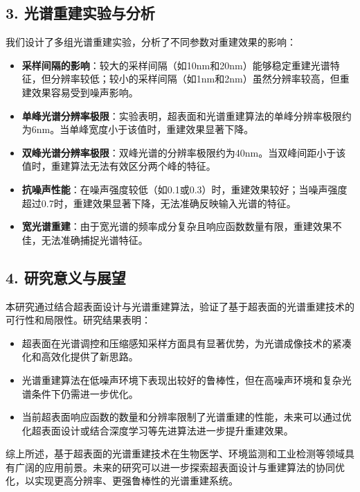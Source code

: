 \documentclass[12pt,hyperref,a4paper,UTF8]{ctexart}
\begin{document}
\subsection*{3. 光谱重建实验与分析}
我们设计了多组光谱重建实验，分析了不同参数对重建效果的影响：
\begin{itemize}
    \item \textbf{采样间隔的影响}：较大的采样间隔（如10nm和20nm）能够稳定重建光谱特征，但分辨率较低；较小的采样间隔（如1nm和2nm）虽然分辨率较高，但重建效果容易受到噪声影响。
    \item \textbf{单峰光谱分辨率极限}：实验表明，超表面和光谱重建算法的单峰分辨率极限约为6nm。当单峰宽度小于该值时，重建效果显著下降。
    \item \textbf{双峰光谱分辨率极限}：双峰光谱的分辨率极限约为40nm。当双峰间距小于该值时，重建算法无法有效区分两个峰的特征。
    \item \textbf{抗噪声性能}：在噪声强度较低（如0.1或0.3）时，重建效果较好；当噪声强度超过0.7时，重建效果显著下降，无法准确反映输入光谱的特征。
    \item \textbf{宽光谱重建}：由于宽光谱的频率成分复杂且响应函数数量有限，重建效果不佳，无法准确捕捉光谱特征。
\end{itemize}

\subsection*{4. 研究意义与展望}
本研究通过结合超表面设计与光谱重建算法，验证了基于超表面的光谱重建技术的可行性和局限性。研究结果表明：
\begin{itemize}
    \item 超表面在光谱调控和压缩感知采样方面具有显著优势，为光谱成像技术的紧凑化和高效化提供了新思路。
    \item 光谱重建算法在低噪声环境下表现出较好的鲁棒性，但在高噪声环境和复杂光谱条件下仍需进一步优化。
    \item 当前超表面响应函数的数量和分辨率限制了光谱重建的性能，未来可以通过优化超表面设计或结合深度学习等先进算法进一步提升重建效果。
\end{itemize}

综上所述，基于超表面的光谱重建技术在生物医学、环境监测和工业检测等领域具有广阔的应用前景。未来的研究可以进一步探索超表面设计与重建算法的协同优化，以实现更高分辨率、更强鲁棒性的光谱重建系统。



\newpage


\end{document}
